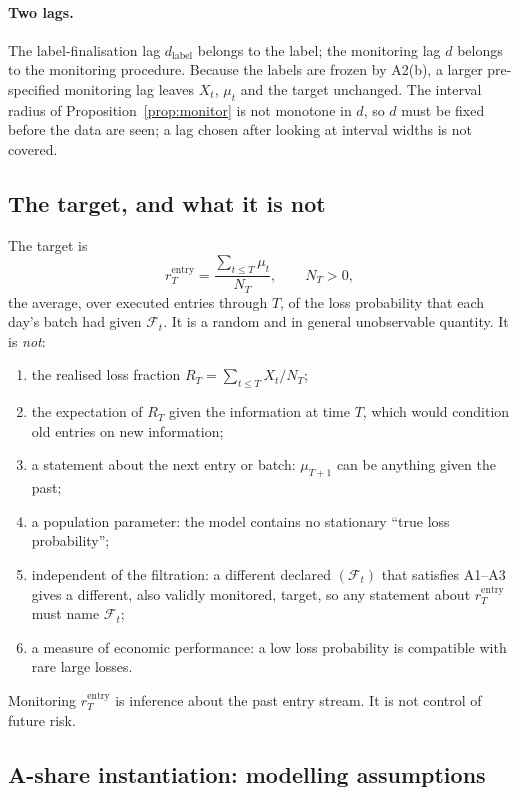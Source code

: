\documentclass[11pt]{article}
\theoremstyle{remark}
\newcommand{\cF}{\mathcal{F}}
\newcommand{\rentry}{r_T^{\mathrm{entry}}}
\begin{document}
\paragraph{Two lags.}
The label-finalisation lag $d_{\mathrm{label}}$ belongs to the label; the monitoring lag $d$
belongs to the monitoring procedure. Because the labels are frozen by A2(b), a larger
pre-specified monitoring lag leaves $X_t$, $\mu_t$ and the target unchanged. The interval radius
of Proposition~\ref{prop:monitor} is not monotone in $d$, so $d$ must be fixed before the data
are seen; a lag chosen after looking at interval widths is not covered.

\subsection{The target, and what it is not}
\label{sec:target}

The target is
\[
\rentry=\frac{\sum_{t\le T}\mu_t}{N_T},\qquad N_T>0,
\]
the average, over executed entries through $T$, of the loss probability that each day's batch
had given $\cF_t$. It is a random and in general unobservable quantity. It is \emph{not}:
\begin{enumerate}
\item the realised loss fraction $R_T=\sum_{t\le T}X_t/N_T$;
\item the expectation of $R_T$ given the information at time $T$, which would condition old
entries on new information;
\item a statement about the next entry or batch: $\mu_{T+1}$ can be anything given the past;
\item a population parameter: the model contains no stationary ``true loss probability'';
\item independent of the filtration: a different declared $(\cF_t)$ that satisfies A1--A3 gives
a different, also validly monitored, target, so any statement about $\rentry$ must name $\cF_t$;
\item a measure of economic performance: a low loss probability is compatible with rare large
losses.
\end{enumerate}
Monitoring $\rentry$ is inference about the past entry stream. It is not control of future risk.

\subsection{A-share instantiation: modelling assumptions}
\label{sec:ashare}
\end{document}
